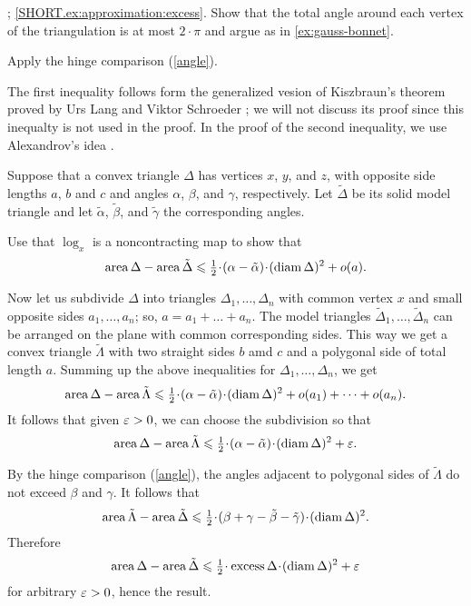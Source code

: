 \parbf{\ref{ex:approximation}}; \ref{SHORT.ex:approximation:excess}.
Show that the total angle around each vertex of the triangulation is at most $2\cdot\pi$ and argue as in \ref{ex:gauss-bonnet}.

Apply the hinge comparison (\ref{angle}).

The first inequality follows form the generalized vesion of Kiszbraun's theorem proved by Urs Lang and Viktor Schroeder \cite{lang-schroeder:kirszbraun, alexander-kapovitch-kirszbraun,alexander-kapovitch-petrunin2024};
we will not discuss its proof since this inequalty is not used in the proof.
In the proof of the second inequality, we use Alexandrov's idea \cite[X §~1]{alexandrov-1948}.

Suppose that a convex triangle $\Delta$ has vertices $x$, $y$, and $z$, with opposite side lengths $a$, $b$ and $c$ and angles $\alpha$, $\beta$, and $\gamma$, respectively.
Let $\tilde\Delta$ be its solid model triangle and let $\tilde \alpha$, $\tilde \beta$, and $\tilde \gamma$ the corresponding angles.

Use that $\log_x$ is a noncontracting map to show that
\[\area\Delta-\area\tilde\Delta\le \tfrac12\cdot(\alpha-\tilde\alpha)\cdot (\diam \Delta)^2+o(a).\]

Now let us subdivide $\Delta$ into triangles $\Delta_1,\dots,\Delta_n$ with common vertex $x$ and small opposite sides $a_1,\dots,a_n$; so, $a=a_1+\dots+a_n$.
The model triangles $\tilde\Delta_1,\dots,\tilde\Delta_n$ can be arranged on the plane with common corresponding sides.
This way we get a convex triangle $\tilde\Lambda$ with two straight sides $b$ amd $c$ and a polygonal side of total length $a$.
Summing up the above inequalities for $\Delta_1,\dots,\Delta_n$, we get
\[\area\Delta-\area\tilde\Lambda\le \tfrac12\cdot(\alpha-\tilde\alpha)\cdot (\diam\Delta)^2+o(a_1)+\dots +o(a_n).\]
It follows that given $\varepsilon>0$, we can choose the subdivision so that
\[\area\Delta-\area\tilde\Lambda\le \tfrac12\cdot(\alpha-\tilde\alpha)\cdot (\diam\Delta)^2+\eps.\]

By the hinge comparison (\ref{angle}), the angles adjacent to polygonal sides of $\tilde\Lambda$ do not exceed $\beta$ and $\gamma$.
It follows that
\[\area\tilde\Lambda-\area\tilde\Delta\le \tfrac12\cdot(\beta+\gamma-\tilde\beta-\tilde\gamma)\cdot (\diam \Delta)^2.\]
Therefore
\[\area\Delta-\area\tilde\Delta\le \tfrac12\cdot\excess\Delta\cdot (\diam \Delta)^2+\eps\]
for arbitrary $\varepsilon>0$, hence the result.



